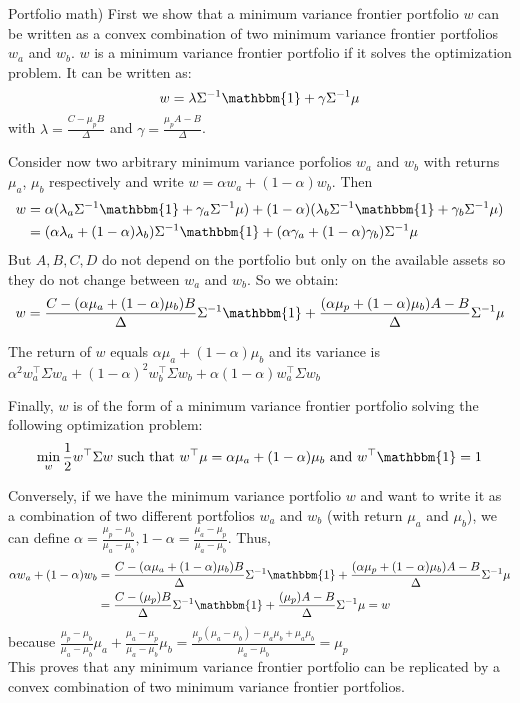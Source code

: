 \documentclass[10pt]{article}
\newenvironment{exercise}[2][Exercise]{\begin{trivlist}
  \item[\hskip \labelsep {\bfseries #1}\hskip \labelsep {\bfseries #2.}]}{\end{trivlist}}
\begin{document}
\begin{exercise}{2}(Portfolio math)
   First we show that a minimum variance frontier portfolio $w$ can be written as a convex combination of two minimum variance frontier portfolios $w_a$ and $w_b$.
   $w$ is a minimum variance frontier portfolio if it solves the optimization problem. It can be written as: 
   $$ w = \lambda\Sigma^{-1}\mathbbm{1}+ \gamma\Sigma^{-1}\mu$$ with $\lambda = \frac{C- \mu_pB}{\Delta}$ and $\gamma = \frac{\mu_pA-B}{\Delta}$. 

   Consider now two arbitrary minimum variance porfolios $w_a$ and $w_b$ with returns $\mu_a$, $\mu_b$ respectively and write $w = \alpha w_a + (1-\alpha)w_b$. 
   Then \begin{align*}
    w &= \alpha (\lambda_a\Sigma^{-1}\mathbbm{1} + \gamma_a\Sigma^{-1}\mu) + (1-\alpha)(\lambda_b\Sigma^{-1}\mathbbm{1} + \gamma_b\Sigma^{-1}\mu) \\
    &= (\alpha \lambda_a + (1-\alpha) \lambda_b)\Sigma^{-1}\mathbbm{1} + (\alpha \gamma_a + (1-\alpha) \gamma_b)\Sigma^{-1}\mu
   \end{align*} 
   But $A,B,C,D$ do not depend on the portfolio but only on the available assets so they do not change between $w_a$ and $w_b$. So we obtain:
   $$ w = \frac{C- (\alpha\mu_a+(1-\alpha)\mu_b)B}{\Delta}\Sigma^{-1}\mathbbm{1} + \frac{(\alpha\mu_p + (1-\alpha)\mu_b)A-B}{\Delta}\Sigma^{-1}\mu$$

  The return of $w$ equals $\alpha\mu_a+(1-\alpha)\mu_b$ and its variance is $\alpha^2 w_a^\top\Sigma w_a + (1-\alpha)^2 w_b^\top\Sigma w_b + \alpha(1-\alpha)w_a^\top\Sigma w_b$

  Finally, $w$ is of the form of a minimum variance frontier portfolio solving the following optimization problem: 
  $$ \min_{w} \frac{1}{2} w^\top\Sigma w \text{ such that } w^\top\mu = \alpha\mu_a+(1-\alpha)\mu_b \text{ and } w^\top\mathbbm{1} = 1$$
  
  Conversely, if we have the minimum variance portfolio $w$ and want to write it as a combination of two different portfolios $w_a$ and $w_b$ (with return $\mu_a$ and $\mu_b$), we can define $\alpha = \frac{\mu_p-\mu_b}{\mu_a-\mu_b}, 1- \alpha = \frac{\mu_a - \mu_p}{\mu_a - \mu_b}$. 
  Thus, \begin{align*}
    \alpha w_a + (1-\alpha)w_b &= \frac{C- (\alpha\mu_a+(1-\alpha)\mu_b)B}{\Delta}\Sigma^{-1}\mathbbm{1} + \frac{(\alpha\mu_p + (1-\alpha)\mu_b)A-B}{\Delta}\Sigma^{-1}\mu \\
    &= \frac{C- (\mu_p)B}{\Delta}\Sigma^{-1}\mathbbm{1} + \frac{(\mu_p)A-B}{\Delta}\Sigma^{-1}\mu = w
  \end{align*} because $ \frac{\mu_p-\mu_b}{\mu_a-\mu_b}\mu_a + \frac{\mu_a - \mu_p}{\mu_a - \mu_b}\mu_b = \frac{\mu_p(\mu_a-\mu_b)-\mu_a\mu_b + \mu_a\mu_b}{\mu_a-\mu_b} = \mu_p$
\\
  This proves that any minimum variance frontier portfolio can be replicated by a convex combination of two minimum variance frontier portfolios. 


\end{exercise}
\end{document}
